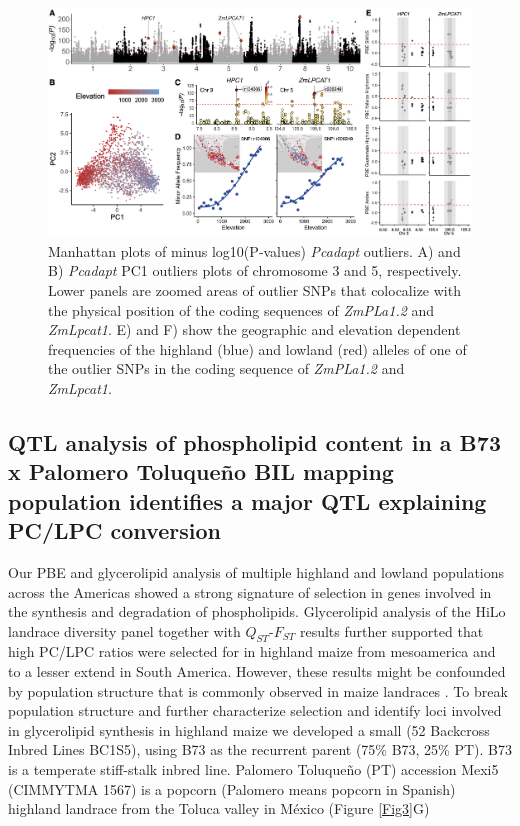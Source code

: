 \documentclass[9pt,twocolumn,twoside,lineno]{gsajnl}
\begin{document}
\begin{figure}[!ht]
\begin{center}
\includegraphics[width=0.4\paperwidth]{Figures/Fig_2.png}
\caption{Manhattan plots of minus log10(P‐values) \textit{Pcadapt} outliers. A) and B) \textit{Pcadapt} PC1 outliers plots of chromosome 3 and 5, respectively. 
Lower panels are zoomed areas of outlier SNPs that colocalize with the physical position of the coding sequences of \textit{ZmPLa1.2} and \textit{ZmLpcat1}. E) and F) show the geographic and elevation dependent frequencies of the highland (blue) and lowland (red) alleles of one of the outlier SNPs in the coding sequence of \textit{ZmPLa1.2} and \textit{ZmLpcat1}.}
\label{Fig2}
\end{center}
\end{figure} 

\subsection{QTL analysis of phospholipid content in a B73 x Palomero Toluqueño BIL mapping population identifies a major QTL explaining PC/LPC conversion} 

Our PBE and glycerolipid analysis of multiple highland and lowland populations across the Americas showed a strong signature of selection in genes involved in the synthesis and degradation of phospholipids. Glycerolipid analysis of the HiLo landrace diversity panel together with $Q_{ST}$-$F_{ST}$ results further supported that high PC/LPC ratios were selected for in highland maize from mesoamerica and to a lesser extend in South America.   
However, these results might be confounded by population structure that is commonly observed in maize landraces \cite{Romero_Navarro2017-cn}. 
To break population structure and further characterize selection and identify loci involved in glycerolipid synthesis in highland maize we developed a small (52 Backcross Inbred  Lines BC1S5), using B73 as the recurrent parent (75\% B73, 25\% PT). 
B73 is a temperate stiff-stalk inbred line. Palomero Toluqueño (PT) accession Mexi5 (CIMMYTMA 1567) is a popcorn (Palomero means popcorn in Spanish) highland landrace from the Toluca valley in México (Figure \ref{Fig3}G) 
\end{document}
